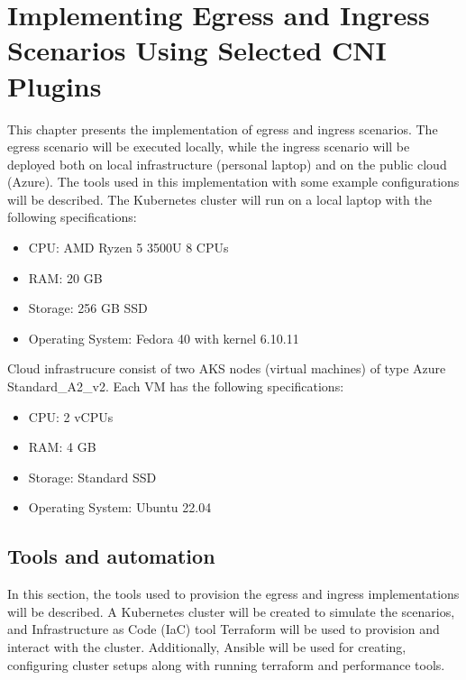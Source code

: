 \chapter{Implementing Egress and Ingress Scenarios Using Selected CNI Plugins}
\label{cha:practical_impl}

This chapter presents the implementation of egress and ingress scenarios. The egress scenario will be executed locally, while the ingress scenario will be deployed both on local infrastructure (personal laptop) and on the public cloud (Azure). The tools used in this implementation with some example configurations will be described.
The Kubernetes cluster will run on a local laptop with the following specifications:
\begin{itemize}
  \item CPU: AMD Ryzen 5 3500U 8 CPUs
  \item RAM: 20 GB
  \item Storage: 256 GB SSD
  \item Operating System: Fedora 40 with kernel 6.10.11
\end{itemize}

Cloud infrastrucure consist of two AKS nodes (virtual machines) of type Azure Standard\_A2\_v2. Each VM has the following specifications:
\begin{itemize}
  \item CPU: 2 vCPUs
  \item RAM: 4 GB
  \item Storage: Standard SSD
  \item Operating System: Ubuntu 22.04
\end{itemize}






\section{Tools and automation}
\label{sec:tools}

In this section, the tools used to provision the egress and ingress implementations will be described. A Kubernetes cluster will be created to simulate the scenarios, and Infrastructure as Code (IaC) tool Terraform will be used to provision and interact with the cluster. Additionally, Ansible will be used for creating, configuring cluster setups along with running terraform and performance tools.



